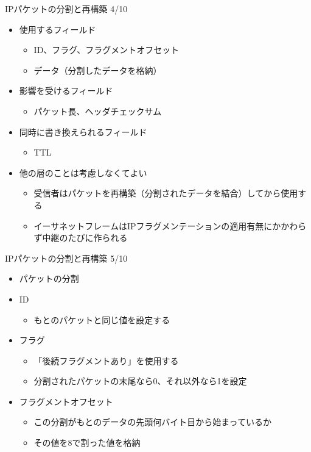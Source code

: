 \documentclass[12pt,aspectratio=169]{beamer}
\begin{document}
\begin{frame}{IPパケットの分割と再構築 4/10}

  \begin{itemize}
    \item 使用するフィールド
      \begin{itemize}
        \item ID、フラグ、フラグメントオフセット
        \item データ（分割したデータを格納）
      \end{itemize}
    \item 影響を受けるフィールド
      \begin{itemize}
        \item パケット長、ヘッダチェックサム
      \end{itemize}
    \item 同時に書き換えられるフィールド
      \begin{itemize}
        \item TTL
      \end{itemize}

    \item 他の層のことは考慮しなくてよい
      \begin{itemize}
        \item 受信者はパケットを再構築（分割されたデータを結合）してから使用する
        \item イーサネットフレームはIPフラグメンテーションの適用有無にかかわらず中継のたびに作られる
      \end{itemize}

  \end{itemize}

\end{frame}


\begin{frame}{IPパケットの分割と再構築 5/10}

  \begin{itemize}
    \item パケットの分割
    \item ID
      \begin{itemize}
        \item もとのパケットと同じ値を設定する
      \end{itemize}
    \item フラグ
      \begin{itemize}
        \item 「後続フラグメントあり」を使用する
        \item 分割されたパケットの末尾なら0、それ以外なら1を設定
      \end{itemize}
    \item フラグメントオフセット
      \begin{itemize}
        \item この分割がもとのデータの先頭何バイト目から始まっているか
        \item その値を8で割った値を格納
      \end{itemize}

  \end{itemize}

\end{frame}
\end{document}
